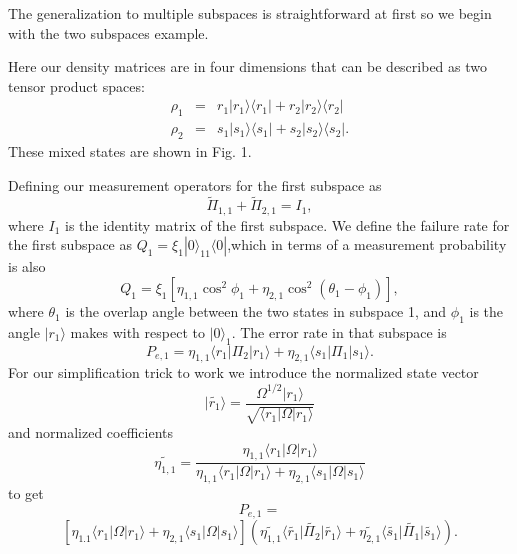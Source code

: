 \documentclass[12pt,oneside,english,reqno]{amsbook}
\numberwithin{section}{chapter}
\numberwithin{equation}{section}
\numberwithin{figure}{section}
\newcommand{\br}[1]{\langle #1|}
\newcommand{\ke}[1]{|#1\rangle}
\begin{document}
The generalization to multiple subspaces is straightforward at first  so we begin with the two subspaces example.

Here our density matrices are in four dimensions that can be described as two tensor product spaces:
\begin{eqnarray}
 \rho_1 &=& r_1 \vert r_1 \rangle \langle r_1 \vert  + r_2 \vert r_2 \rangle \langle r_2 \vert \\
 \rho_2 &=& s_1 \vert s_1 \rangle \langle s_1 \vert  + s_2 \vert s_2 \rangle \langle s_2 \vert. \nonumber\end{eqnarray}
These mixed states are shown in Fig. 1.


Defining our measurement operators for the first subspace as
\begin{equation} \widetilde \Pi_{1,1} + \widetilde \Pi_{2,1} = I_1,\end{equation}
where $I_1$ is the identity matrix of the first subspace.  We define the failure rate for the first subspace as $Q_1 = \xi_1 \ke 0_{11} \br 0 $,which in terms of a measurement probability is also
\begin{equation} Q_1 = \xi_1 [ \eta_{1,1} \cos^2 \phi_1 + \eta_{2,1} \cos^2 (\theta_1 - \phi_1)],\end{equation}
where $\theta_1 $ is the overlap angle between the two states in subspace 1, and $\phi_1$ is the angle $\ke {r_1}$ makes with respect to $\vert 0 \rangle_1$.  The error rate in that subspace is
\begin{equation}P_{e,1} = \eta_{1,1} \langle r_1 \vert \Pi_2 \vert r_1 \rangle + \eta_{2,1} \langle s_1 \vert \Pi_1 \vert s_1 \rangle. \end{equation}
For our simplification trick to work we introduce the normalized state vector \begin{equation} \vert \widetilde{r_1} \rangle  = \frac{ \Omega^{1/2} \vert r_1 \rangle}{\sqrt{\langle r_1 \vert \Omega \vert r_1 \rangle}} \end{equation}
and normalized coefficients
\begin{equation} \widetilde{\eta_{1,1}} = \frac{\eta_{1,1} \langle r_1 \vert \Omega \vert r_1 \rangle}{\eta_{1,1} \langle r_1 \vert \Omega \vert r_1 \rangle + \eta_{2,1} \langle s_1 \vert \Omega \vert s_1 \rangle}\end{equation}
to get 
\[P_{e,1}= \]
\[ [\eta_{1.1} \langle r_1 \vert \Omega \vert r_1 \rangle + \eta_{2,1}\langle s_1 \vert \Omega \vert s_1 \rangle](\widetilde{\eta_{1,1}}\langle\widetilde{r_1} \vert \widetilde{\Pi_2} \vert \widetilde{r_1} \rangle + \widetilde{\eta_{2,1}} \langle \widetilde{s_1} \vert \widetilde{\Pi_1} \vert \widetilde{s_1}\rangle ).\]
\end{document}
